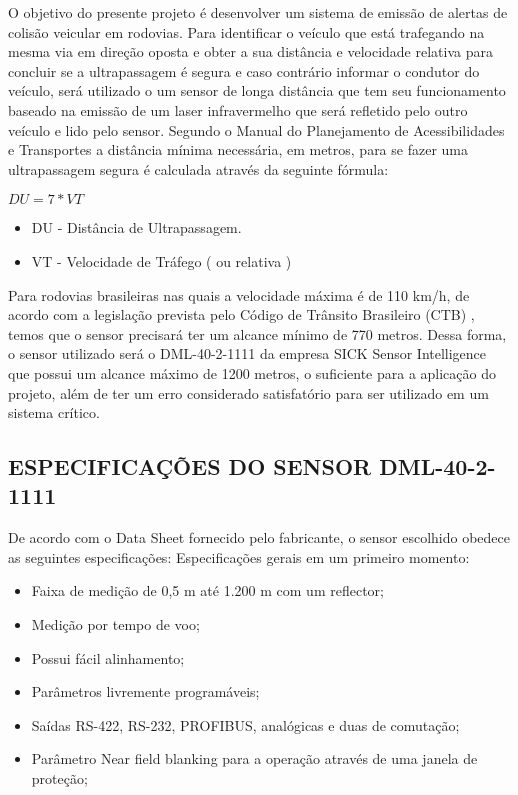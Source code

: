 O objetivo do presente projeto é desenvolver um sistema de emissão de alertas de colisão veicular em rodovias. Para identificar o veículo que está trafegando na mesma via em direção oposta e obter a sua distância e velocidade relativa para concluir se a ultrapassagem é segura e caso contrário informar o condutor do veículo, será utilizado o um sensor de longa distância que tem seu funcionamento baseado na emissão de um laser infravermelho que será refletido pelo outro veículo e lido pelo sensor.
Segundo o Manual do Planejamento de Acessibilidades e Transportes \cite{sensorLaserDML40} a distância mínima necessária, em metros, para se fazer uma ultrapassagem segura é calculada através da seguinte fórmula:

$DU = 7*VT$
\begin{itemize}
  \item DU - Distância de Ultrapassagem.
  \item VT - Velocidade de Tráfego ( ou relativa )
\end{itemize}

Para rodovias brasileiras nas quais a velocidade máxima é de 110 km/h, de acordo com a legislação prevista pelo Código de Trânsito Brasileiro (CTB) \cite{codigoTransitoBrasileiro}, temos que o sensor precisará ter um alcance mínimo de 770 metros.
Dessa forma, o sensor utilizado será o DML-40-2-1111 da empresa SICK Sensor Intelligence que possui um alcance máximo de 1200 metros, o suficiente para a aplicação do projeto, além de ter um erro considerado satisfatório para ser utilizado em um sistema crítico.

\subsection{ESPECIFICAÇÕES DO SENSOR DML-40-2-1111}
De acordo com o Data Sheet \cite{dataSheetDML40} fornecido pelo fabricante, o sensor escolhido obedece as seguintes especificações:
Especificações gerais em um primeiro momento:

\begin{itemize}
	\item Faixa de medição de 0,5 m até 1.200 m com um reflector;
	\item Medição por tempo de voo;
	\item Possui fácil alinhamento;
	\item Parâmetros livremente programáveis;
	\item Saídas RS-422, RS-232, PROFIBUS, analógicas e duas de comutação;
	\item Parâmetro Near field blanking para a operação através de uma janela de proteção;
\end{itemize}


